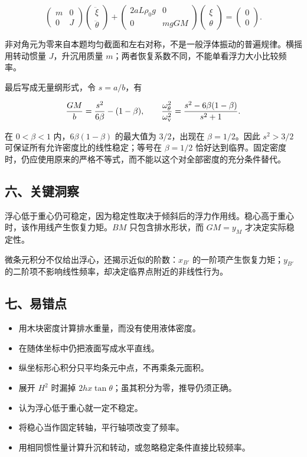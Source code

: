\documentclass[12pt,a4paper,fontset=fandol]{ctexart}
\providecommand{\tightlist}{\setlength{\itemsep}{0pt}\setlength{\parskip}{0pt}}
\begin{document}
\[
\begin{pmatrix}m&0\\0&J\end{pmatrix}
\begin{pmatrix}\ddot\xi\\\ddot\theta\end{pmatrix}
+
\begin{pmatrix}2aL\rho_0g&0\\0&mgGM\end{pmatrix}
\begin{pmatrix}\xi\\\theta\end{pmatrix}
=\begin{pmatrix}0\\0\end{pmatrix}.
\]

非对角元为零来自本题均匀截面和左右对称，不是一般浮体振动的普遍规律。横摇用转动惯量
\(J\)，升沉用质量 \(m\)；两者恢复系数不同，不能单看浮力大小比较频率。

最后写成无量纲形式，令 \(s=a/b\)，有

\[
\frac{GM}{b}=\frac{s^2}{6\beta}-(1-\beta),\qquad
\frac{\omega_\theta^2}{\omega_{\rm v}^2}
=\frac{s^2-6\beta(1-\beta)}{s^2+1}.
\]

在 \(0<\beta<1\) 内，\(6\beta(1-\beta)\) 的最大值为 \(3/2\)，出现在
\(\beta=1/2\)。因此 \(s^2>3/2\) 可保证所有允许密度比的线性稳定；等号在
\(\beta=1/2\)
恰好达到临界。固定密度时，仍应使用原来的严格不等式，而不能以这个对全部密度的充分条件替代。

\subsection{六、关键洞察}\label{ux516dux5173ux952eux6d1eux5bdf-4}

浮心低于重心仍可稳定，因为稳定性取决于倾斜后的浮力作用线。稳心高于重心时，该作用线产生恢复力矩。\(BM\)
只包含排水形状，而 \(GM=y_M\) 才决定实际稳定性。

微条元积分不仅给出浮心，还揭示近似的阶数：\(x_{B'}\)
的一阶项产生恢复力矩；\(y_{B'}\)
的二阶项不影响线性频率，却决定临界点附近的非线性行为。

\subsection{七、易错点}\label{ux4e03ux6613ux9519ux70b9-4}

\begin{itemize}
\tightlist
\item
  用木块密度计算排水重量，而没有使用液体密度。
\item
  在随体坐标中仍把液面写成水平直线。
\item
  纵坐标形心积分只平均条元中点，不再乘条元面积。
\item
  展开 \(H^2\) 时漏掉 \(2hx\tan\theta\)；虽其积分为零，推导仍须正确。
\item
  认为浮心低于重心就一定不稳定。
\item
  将稳心当作固定转轴，平行轴项改变了频率。
\item
  用相同惯性量计算升沉和转动，或忽略稳定条件直接比较频率。
\end{itemize}
\end{document}
